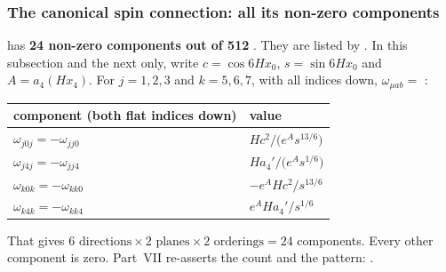 \subsubsection{The canonical spin connection: all its non-zero components}
\label{csc:components}\label{sec:3.8.6}

 has \textbf{24 non-zero components out of 512} .
They are listed by . In this subsection and the
next only, write $c=\cos 6Hx_0$, $s=\sin 6Hx_0$ and $A=a_4(Hx_4)$. For $j=1,2,3$ and $k=5,6,7$,
with all indices down,
$\omega_{\mu ab}=$ :

\begin{center}
\begin{tabular}{@{}ll@{}}
\toprule
component (both flat indices down) & value \\
\midrule
$\omega_{j0j}=-\omega_{jj0}$ & $H c^2\big/\bigl(e^{A}s^{13/6}\bigr)$ \\
$\omega_{j4j}=-\omega_{jj4}$ & $H a_4'\big/\bigl(e^{A}s^{1/6}\bigr)$ \\
$\omega_{k0k}=-\omega_{kk0}$ & $-e^{A}H c^2\big/s^{13/6}$ \\
$\omega_{k4k}=-\omega_{kk4}$ & $e^{A}H a_4'\big/s^{1/6}$ \\
\bottomrule
\end{tabular}
\end{center}

\noindent That gives $6\text{ directions}\times2\text{ planes}\times2\text{ orderings}=24$
components. Every other component is zero.
Part~VII re-asserts the count and the pattern:  .

